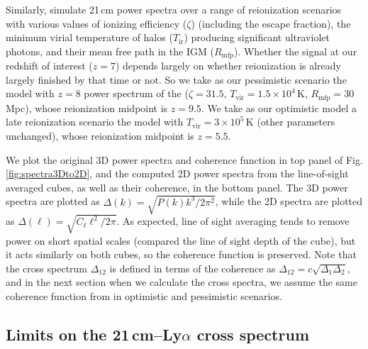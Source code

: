 \documentclass{emulateapj}
\begin{document}
Similarly, \citet{PoberNextGen} simulate 21\,cm power spectra over a range of reionization scenarios with various values of ionizing efficiency ($\zeta$) (including the escape fraction), the minimum virial temperature of halos ($T_\text{ir}$) producing significant ultraviolet photons, and their mean free path in the IGM ($R_\text{mfp}$). Whether the signal at our redshift of interest ($z=7$) depends largely on whether reionization is already largely finished by that time or not. So we take as our pessimistic scenario the model with $z=8$ power spectrum of the ($\zeta =31.5$, $T_\text{vir}=1.5\times10^4$\,K, $R_\text{mfp}=30$\,Mpc), whose reionization midpoint is $z=9.5$. We take as our optimistic model a late reionization scenario the model with $T_\text{vir}=3\times10^5$\,K (other parameters unchanged), whose reionization midpoint is $z=5.5$. 

We plot the original 3D power spectra and coherence function in top panel of Fig. \ref{fig:spectra3Dto2D}, and the computed 2D power spectra from the line-of-sight averaged cubes, as well as their coherence, in the bottom panel. The 3D power spectra are plotted as $\Delta(k)=\sqrt{P(k)k^3/2\pi^2}$, while the 2D spectra are plotted as $\Delta(\ell)=\sqrt{C_\ell \ell^2/2\pi}$. As expected, line of sight averaging tends to remove power on short spatial scales (compared the line of sight depth of the cube), but it acts similarly on both cubes, so the coherence function is preserved. Note that the cross spectrum $\Delta_{12}$ is defined in terms of the coherence as $\Delta_{12}=c\sqrt{\Delta_1\Delta_2}$, and in the next section when we calculate the cross spectra, we assume the same coherence function from \citet{Heneka2016} in optimistic and pessimistic scenarios.

\subsection{Limits on the 21\,cm--Ly$\alpha$ cross spectrum}
\end{document}
